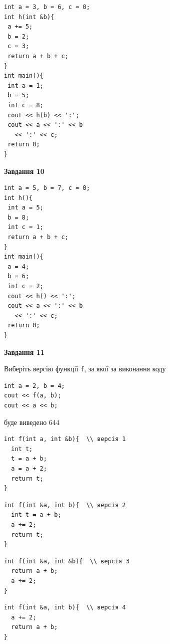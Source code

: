 \documentclass[12pt, ukrainian]{article}
\def\code#1{\Verb!#1!}
\begin{document}
{\begin {large}
\begin{minipage}[t]{7.0cm}
\begin{verbatim}
int a = 3, b = 6, c = 0;
int h(int &b){
 a += 5;
 b = 2;
 c = 3;
 return a + b + c;
}
int main(){
 int a = 1;
 b = 5;
 int c = 8;
 cout << h(b) << ':';
 cout << a << ':' << b 
   << ':' << c;
 return 0;
}
\end{verbatim}



\begin{center}
\textbf{Завдання 10}
\end{center}
\vspace{-8mm}

\begin{verbatim}
int a = 5, b = 7, c = 0;
int h(){
 int a = 5;
 b = 8;
 int c = 1;
 return a + b + c;
}
int main(){
 a = 4;
 b = 6;
 int c = 2;
 cout << h() << ':';
 cout << a << ':' << b 
   << ':' << c;
 return 0;
}
\end{verbatim}

\end{minipage}
\vline \hspace{1mm}
\begin{minipage}[t]{11.0cm}

\begin{center}
\textbf{Завдання 11}
\end{center}
Виберіть версію функції \code{f}, за якої за виконання коду
\begin{verbatim}
int a = 2, b = 4;
cout << f(a, b);
cout << a << b;
\end{verbatim}

буде виведено 644

\begin{verbatim}
int f(int a, int &b){  \\ версія 1
  int t;
  t = a + b;
  a = a + 2;
  return t;
}
\end{verbatim}

\vspace{-8mm}\begin{verbatim}
int f(int &a, int b){  \\ версія 2
  int t = a + b;
  a += 2;
  return t;
}
\end{verbatim}

\vspace{-8mm}\begin{verbatim}
int f(int &a, int &b){  \\ версія 3
  return a + b;
  a += 2;
}
\end{verbatim}

\vspace{-8mm}\begin{verbatim}
int f(int &a, int b){  \\ версія 4
  a += 2;
  return a + b;
}
\end{verbatim}




\end{minipage}
\end{large}}
\end{document}
